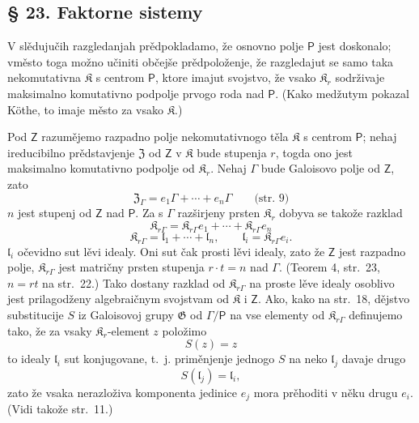\documentclass[11pt]{article}
\newcommand{\foreign}[1]{#1}
\begin{document}
\subsection*{§ 23. Faktorne sistemy}\label{faktorensysteme}

V slědujučih razgledanjah prědpokladamo, že osnovno polje \(\mathsf P\) jest doskonalo; vměsto toga možno učiniti občejše prědpoloženje, že razgledajut se samo taka nekomutativna \(\mathfrak K\) s centrom \(\mathsf P\), ktore imajut svojstvo, že vsako \(\mathfrak K_r\) sodrživaje maksimalno komutativno podpolje prvogo roda nad \(\mathsf P\). (Kako medžutym pokazal \foreign{Köthe}, to imaje město za vsako \(\mathfrak K\).)

Pod \(\mathsf{Z}\) razumějemo razpadno polje nekomutativnogo těla \(\mathfrak K\) s centrom \(\mathsf P\); nehaj ireducibilno prědstavjenje \(\mathfrak Z\) od \(\mathsf{Z}\) v \(\mathfrak K\) bude stupenja \(r\), togda ono jest maksimalno komutativno podpolje od \(\mathfrak K_r\). Nehaj \(\Gamma\) bude Galoisovo polje od \(\mathsf{Z}\), zato
\[
\mathfrak Z_\Gamma=e_1\Gamma+\cdots+e_n\Gamma
\qquad\text{(str.~9)}
\]
\(n\) jest stupenj od \(\mathsf{Z}\) nad \(\mathsf P\). Za s \(\Gamma\) razširjeny prsten \(\mathfrak K_r\) dobyva se takože razklad
\[
\mathfrak K_{r\Gamma}=\mathfrak K_{r\Gamma}e_1+\cdots+\mathfrak K_{r\Gamma}e_n
\]
\[
\mathfrak K_{r\Gamma}=\mathfrak l_1+\cdots+\mathfrak l_n,\qquad
\mathfrak l_i=\mathfrak K_{r\Gamma}e_i.
\]
\(\mathfrak l_i\) očevidno sut lěvi idealy. Oni sut čak prosti lěvi idealy, zato že \(\mathsf{Z}\) jest razpadno polje, \(\mathfrak K_{r\Gamma}\) jest matričny prsten stupenja \(r\cdot t=n\) nad \(\Gamma\). (Teorem 4, str.~23, \(n=rt\) na str.~22.) Tako dostany razklad od \(\mathfrak K_{r\Gamma}\) na proste lěve idealy osoblivo jest prilagodženy algebraičnym svojstvam od \(\mathfrak K\) i \(\mathsf{Z}\). Ako, kako na str.~18, dějstvo substitucije \(S\) iz Galoisovoj grupy \(\mathfrak G\) od \(\Gamma/\mathsf P\) na vse elementy od \(\mathfrak K_{r\Gamma}\) definujemo tako, že za vsaky \(\mathfrak K_r\)-element \(z\) položimo
\[
S(z)=z
\]
to idealy \(\mathfrak l_i\) sut konjugovane, t.~j. priměnjenje jednogo \(S\) na neko \(\mathfrak l_j\) davaje drugo
\[
S(\mathfrak l_j)=\mathfrak l_i,
\]
zato že vsaka nerazloživa komponenta jedinice \(e_j\) mora prěhoditi v něku drugu \(e_i\). (Vidi takože str.~11.)
\end{document}
